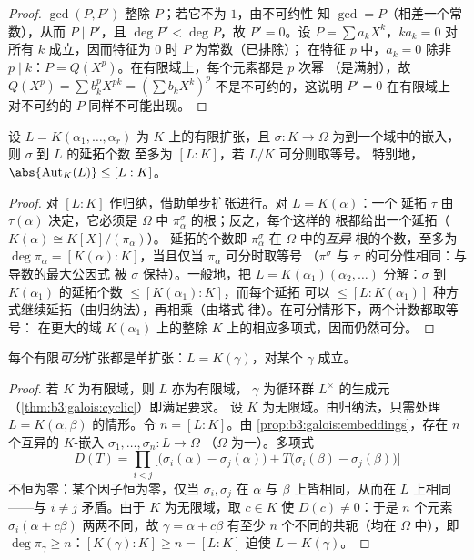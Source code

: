 \begin{proof}
$\gcd(P, P')$ 整除 $P$；若它不为 $1$，由不可约性
知 $\gcd = P$（相差一个常数），从而 $P \mid P'$，且 $\deg
P' < \deg P$，故 $P' = 0$。设 $P = \sum a_kX^k$，$ka_k = 0$
对所有 $k$ 成立，因而特征为 $0$ 时 $P$ 为常数（已排除）；
在特征 $p$ 中，$a_k = 0$ 除非 $p \mid k$：$P =
Q(X^p)$。在有限域上，每个元素都是 $p$ 次幂
（是满射），故 $Q(X^p) = \sum b_k^p X^{pk} = (\sum
b_kX^k)^p$ 不是不可约的，这说明 $P' = 0$ 在有限域上
对不可约的 $P$ 同样不可能出现。
\end{proof}

\begin{proposition}[嵌入计数]\label{prop:b3:galois:embeddings}
设 $L = K(\alpha_1, \dots, \alpha_r)$ 为 $K$ 上的有限扩张，且
$\sigma \colon K \to \Omega$ 为到一个域中的嵌入，
则 $\sigma$ 到 $L$ 的延拓个数
至多为 $[L:K]$，若 $L/K$ 可分则取等号。
特别地，$\abs{\operatorname{Aut}_K(L)} \leq [L:K]$。
\end{proposition}

\begin{proof}
对 $[L:K]$ 作归纳，借助单步扩张进行。对 $L = K(\alpha)$：一个
延拓 $\tau$ 由 $\tau(\alpha)$ 决定，它必须是
$\Omega$ 中 $\pi_\alpha^\sigma$ 的根；反之，每个这样的
根都给出一个延拓（$K(\alpha) \cong K[X]/(\pi_\alpha)$）。
延拓的个数即 $\pi_\alpha^\sigma$ 在 $\Omega$ 中的\emph{互异}
根的个数，至多为 $\deg\pi_\alpha =
[K(\alpha):K]$，当且仅当 $\pi_\alpha$ 可分时取等号
（$\pi^\sigma$ 与 $\pi$ 的可分性相同：与导数的最大公因式
被 $\sigma$ 保持）。一般地，把 $L =
K(\alpha_1)(\alpha_2, \dots)$ 分解：$\sigma$ 到
$K(\alpha_1)$ 的延拓个数 $\leq [K(\alpha_1):K]$，而每个延拓
可以 $\leq [L : K(\alpha_1)]$ 种方式继续延拓（由归纳法），再相乘（由塔式
律）。在可分情形下，两个计数都取等号：
在更大的域 $K(\alpha_1)$ 上的整除
$K$ 上的相应多项式，因而仍然可分。
\end{proof}

\begin{theorem}[本原元定理]\label{thm:b3:galois:primitive}
每个有限\emph{可分}扩张都是单扩张：$L =
K(\gamma)$，对某个 $\gamma$ 成立。
\end{theorem}

\begin{proof}
若 $K$ 为有限域，则 $L$ 亦为有限域，
$\gamma$ 为循环群 $L^\times$ 的生成元（\cref{thm:b3:galois:cyclic}）即满足要求。
设 $K$ 为无限域。由归纳法，只需处理 $L =
K(\alpha, \beta)$ 的情形。令 $n = [L:K]$。由
\cref{prop:b3:galois:embeddings}，存在 $n$ 个互异的
$K$-嵌入 $\sigma_1, \dots, \sigma_n \colon L \to \Omega$
（$\Omega$ 为一）。多项式
\[
D(T)=\prod_{i<j}\bigl[\bigl(\sigma_i(\alpha)-\sigma_j(\alpha)
\bigr) + T\bigl(\sigma_i(\beta) - \sigma_j(\beta)\bigr)\bigr]
\]
不恒为零：某个因子恒为零，仅当
$\sigma_i, \sigma_j$ 在 $\alpha$ 与 $\beta$ 上皆相同，从而在
$L$ 上相同——与 $i \neq j$ 矛盾。由于 $K$ 为无限域，取 $c \in
K$ 使 $D(c) \ne 0$：于是 $n$ 个元素 $\sigma_i(\alpha +
c\beta)$ 两两不同，故 $\gamma = \alpha + c\beta$
有至少 $n$ 个不同的共轭（均在 $\Omega$ 中），即
$\deg \pi_\gamma \geq n$：$[K(\gamma):K] \geq n = [L:K]$ 迫使
$L = K(\gamma)$。
\end{proof}

